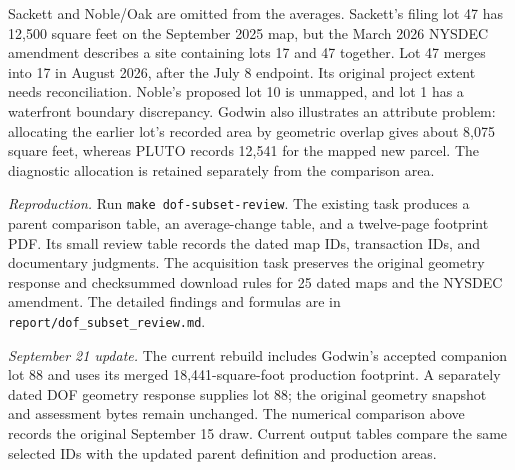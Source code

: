 Sackett and Noble/Oak are omitted from the averages. Sackett's filing lot 47
has 12,500 square feet on the September 2025 map, but the March 2026 NYSDEC
amendment describes a site containing lots 17 and 47 together. Lot 47 merges
into 17 in August 2026, after the July 8 endpoint. Its original project extent
needs reconciliation. Noble's proposed lot 10 is unmapped, and lot 1 has a
waterfront boundary discrepancy. Godwin also illustrates an attribute problem:
allocating the earlier lot's recorded area by geometric overlap gives about
8,075 square feet, whereas PLUTO records 12,541 for the mapped new parcel.
The diagnostic allocation is retained separately from the comparison area.

\small
\textit{Reproduction.} Run \texttt{make dof-subset-review}. The existing
 task produces
a parent comparison table, an average-change table, and a twelve-page footprint
PDF. Its small review table records the dated
map IDs, transaction IDs, and documentary judgments. The acquisition task
preserves the original geometry response and checksummed download rules for
25 dated maps and the NYSDEC amendment. The detailed findings and formulas are
in \texttt{report/dof\_subset\_review.md}.
\normalsize


\textit{September 21 update.} The current rebuild includes Godwin's accepted
companion lot 88 and uses its merged 18,441-square-foot production footprint.
A separately dated DOF geometry response supplies lot 88; the original geometry
snapshot and assessment bytes remain unchanged. The numerical comparison above
records the original September 15 draw. Current output tables compare the
same selected IDs with the updated parent definition and production areas.

